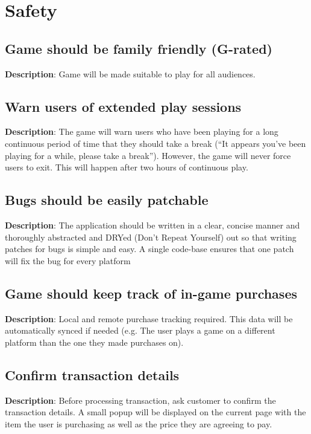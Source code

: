 \section{Safety}
\renewcommand\thesubsection{SAF-%
\ifnum\value{subsection}<10 0\fi
\arabic{subsection}}
\subsection{Game should be family friendly (G-rated)}
\textbf{Description}: Game will be made suitable to play for all audiences.

\subsection{Warn users of extended play sessions}
\textbf{Description}: The game will warn users who have been playing for a
long continuous period of time that they should take a break (\textquotedblleft{}It
appears you\textquoteright{}ve been playing for a while, please take
a break\textquotedblright{}). However, the game will never force users
to exit. This will happen after two hours of continuous play.

\subsection{Bugs should be easily patchable}
\textbf{Description}: The application should be written in a clear, concise
manner and thoroughly abstracted and DRYed (Don\textquoteright{}t
Repeat Yourself) out so that writing patches for bugs is simple and
easy. A single code-base ensures that one patch will fix the bug for
every platform

\subsection{Game should keep track of in-game purchases}
\textbf{Description}: Local and remote purchase tracking required. This data
will be automatically synced if needed (e.g. The user plays a game
on a different platform than the one they made purchases on). 

\subsection{Confirm transaction details}
\textbf{Description}: Before processing transaction, ask customer to confirm
the transaction details. A small popup will be displayed on the current
page with the item the user is purchasing as well as the price they
are agreeing to pay.

